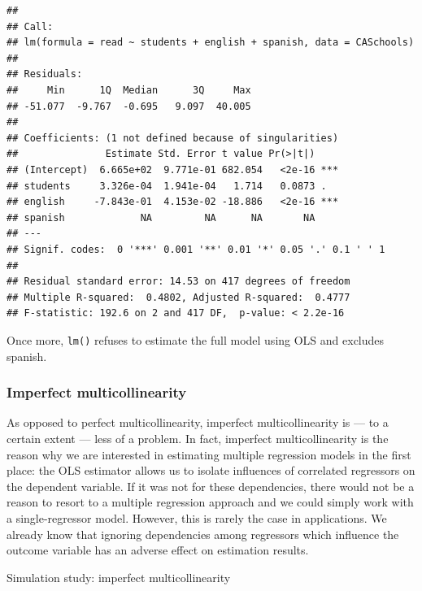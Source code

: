 \documentclass[]{book}
\begin{document}
\begin{verbatim}
## 
## Call:
## lm(formula = read ~ students + english + spanish, data = CASchools)
## 
## Residuals:
##     Min      1Q  Median      3Q     Max 
## -51.077  -9.767  -0.695   9.097  40.005 
## 
## Coefficients: (1 not defined because of singularities)
##               Estimate Std. Error t value Pr(>|t|)    
## (Intercept)  6.665e+02  9.771e-01 682.054   <2e-16 ***
## students     3.326e-04  1.941e-04   1.714   0.0873 .  
## english     -7.843e-01  4.153e-02 -18.886   <2e-16 ***
## spanish             NA         NA      NA       NA    
## ---
## Signif. codes:  0 '***' 0.001 '**' 0.01 '*' 0.05 '.' 0.1 ' ' 1
## 
## Residual standard error: 14.53 on 417 degrees of freedom
## Multiple R-squared:  0.4802, Adjusted R-squared:  0.4777 
## F-statistic: 192.6 on 2 and 417 DF,  p-value: < 2.2e-16
\end{verbatim}

Once more, \texttt{lm()} refuses to estimate the full model using OLS
and excludes spanish.

\hypertarget{imperfect-multicollinearity}{%
\subsubsection{Imperfect
multicollinearity}\label{imperfect-multicollinearity}}

As opposed to perfect multicollinearity, imperfect multicollinearity is
--- to a certain extent --- less of a problem. In fact, imperfect
multicollinearity is the reason why we are interested in estimating
multiple regression models in the first place: the OLS estimator allows
us to isolate influences of correlated regressors on the dependent
variable. If it was not for these dependencies, there would not be a
reason to resort to a multiple regression approach and we could simply
work with a single-regressor model. However, this is rarely the case in
applications. We already know that ignoring dependencies among
regressors which influence the outcome variable has an adverse effect on
estimation results.

Simulation study: imperfect multicollinearity
\end{document}
